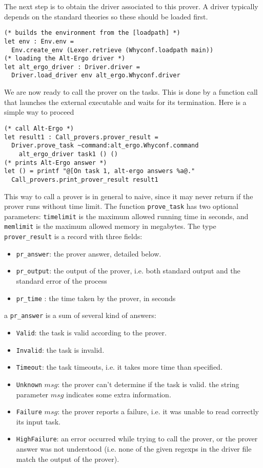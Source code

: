 The next step is to obtain the driver associated to this prover. A
driver typically depends on the standard theories so these should be
loaded first.
\begin{verbatim}
(* builds the environment from the [loadpath] *)
let env : Env.env = 
  Env.create_env (Lexer.retrieve (Whyconf.loadpath main)) 
(* loading the Alt-Ergo driver *)
let alt_ergo_driver : Driver.driver = 
  Driver.load_driver env alt_ergo.Whyconf.driver
\end{verbatim}

We are now ready to call the prover on the tasks. This is done by a
function call that launches the external executable and waits for its
termination. Here is a simple way to proceed
\begin{verbatim}
(* call Alt-Ergo *)
let result1 : Call_provers.prover_result = 
  Driver.prove_task ~command:alt_ergo.Whyconf.command
    alt_ergo_driver task1 () ()
(* prints Alt-Ergo answer *)
let () = printf "@[On task 1, alt-ergo answers %a@."
  Call_provers.print_prover_result result1
\end{verbatim}
This way to call a prover is in general to naive, since it may never
return if the prover runs without time limit. The function
\texttt{prove\_task} has two optional parameters: \texttt{timelimit}
is the maximum allowed running time in seconds, and \texttt{memlimit}
is the maximum allowed memory in megabytes.  The type
\texttt{prover\_result} is a record with three fields:
\begin{itemize}
\item \texttt{pr\_answer}: the prover answer, detailed below.
\item \texttt{pr\_output}: the output of the prover, i.e. both
  standard output and the standard error of the process
\item \texttt{pr\_time} : the time taken by the prover, in seconds
\end{itemize}
a \texttt{pr\_answer} is a sum of several kind of answers:
\begin{itemize}
\item \texttt{Valid}: the task is valid according to the prover.
\item \texttt{Invalid}: the task is invalid.
\item \texttt{Timeout}: the task timeouts, i.e. it takes more time
  than specified.
\item \texttt{Unknown} $msg$: the prover can't determine if the task
  is valid. the string parameter $msg$ indicates some extra
  information.
\item \texttt{Failure} $msg$: the prover reports a failure, i.e. it
  was unable to read correctly its input task.
\item \texttt{HighFailure}: an error occurred while trying to call the
  prover, or the prover answer was not understood (i.e. none of the
  given regexps in the driver file match the output of the prover).
\end{itemize}
